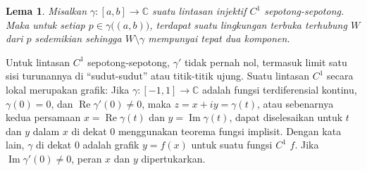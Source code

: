 \documentclass[12pt,openany]{book}
\renewcommand{\Re}{\operatorname{Re}}
\renewcommand{\Im}{\operatorname{Im}}
\newcommand{\C}{{\mathbb{C}}}
\newcommand{\myquote}[1]{``#1''}
\theoremstyle{plain}
\newtheorem{lemma}[thm]{Lema}
\theoremstyle{remark}
\theoremstyle{definition}
\theoremstyle{exercise}
\theoremstyle{example}
\begin{document}
\begin{lemma}
Misalkan $\gamma \colon [a,b] \to \C$ suatu lintasan injektif $C^1$ sepotong-sepotong.
Maka untuk setiap $p \in \gamma \bigl((a,b)\bigr)$, terdapat suatu
lingkungan terbuka terhubung $W$ dari $p$ sedemikian sehingga $W \setminus \gamma$
mempunyai tepat dua komponen.
\end{lemma}

Untuk lintasan $C^1$ sepotong-sepotong, $\gamma'$ tidak pernah
nol, termasuk limit satu sisi turunannya di
\myquote{sudut-sudut} atau
titik-titik ujung. Suatu lintasan $C^1$ secara lokal merupakan grafik:
Jika $\gamma \colon [-1,1] \to \C$ adalah fungsi terdiferensial kontinu,
$\gamma(0) = 0$,
dan $\Re \gamma'(0) \neq 0$, maka
$z=x+iy = \gamma(t)$, atau sebenarnya kedua persamaan
$x = \Re \gamma(t)$ dan $y = \Im \gamma(t)$,
dapat diselesaikan untuk $t$ dan $y$ dalam $x$ di dekat $0$ menggunakan teorema fungsi
implisit. Dengan kata lain, $\gamma$ di dekat $0$ adalah grafik $y=f(x)$ untuk suatu fungsi $C^1$
$f$. Jika $\Im \gamma'(0) \neq 0$, peran $x$ dan $y$
dipertukarkan.
\end{document}
